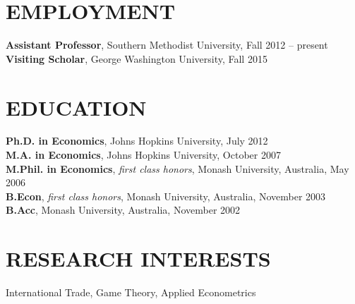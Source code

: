 \documentclass[11pt]{res}
\begin{document}
\begin{resume}
\hspace{-0.5in}\makebox[6.1in]{\hrulefill}

\section{EMPLOYMENT} \vspace{1.5mm}
{\bf Assistant Professor}, Southern Methodist University, Fall 2012 -- present\vspace{.5mm}\\
{\bf Visiting Scholar}, George Washington University, Fall 2015


\section{EDUCATION} \vspace{1.5mm}
    {\bf Ph.D. in Economics}, Johns Hopkins University, July 2012 \vspace{.5mm}\\
    {\bf M.A. in Economics}, Johns Hopkins University, October 2007\vspace{1.5mm}\\
    {\bf M.Phil. in Economics}, \emph{first class honors}, Monash University, Australia, May 2006\vspace{1.5mm}\\
    {\bf B.Econ}, \emph{first class honors}, Monash University, Australia, November 2003\vspace{1.5mm}\\
    {\bf B.Acc}, Monash University, Australia, November 2002


\section{RESEARCH INTERESTS}\vspace{1.5mm}
International Trade, Game Theory, Applied Econometrics


\end{resume}
\end{document}
